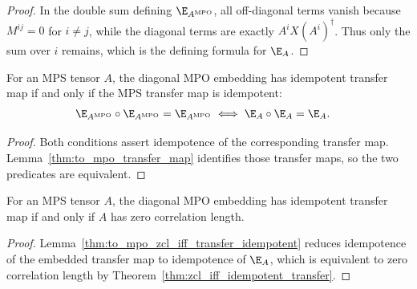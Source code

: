 \begin{proof}
    \leanok
    In the double sum defining $\E_{A^{\mathrm{MPO}}}$, all off-diagonal terms
    vanish because $M^{ij}=0$ for $i\ne j$, while the diagonal terms are
    exactly $A^iX(A^i)^\dagger$. Thus only the sum over $i$ remains, which
    is the defining formula for $\E_A$.
\end{proof}

\begin{lemma}%
    \label{thm:to_mpo_zcl_iff_transfer_idempotent}
    \leanok
    For an MPS tensor $A$, the diagonal MPO embedding has idempotent transfer
    map if and only if the MPS transfer map is idempotent:
    \begin{align}
        \E_{A^{\mathrm{MPO}}}\circ\E_{A^{\mathrm{MPO}}}
        =\E_{A^{\mathrm{MPO}}}
         & \iff
        \E_A\circ\E_A=\E_A.
        \notag
    \end{align}
\end{lemma}

\begin{proof}
    \leanok
    Both conditions assert idempotence of the corresponding transfer map.
    Lemma~\ref{thm:to_mpo_transfer_map} identifies those transfer maps, so
    the two predicates are equivalent.
\end{proof}

\begin{lemma}%
    \label{thm:to_mpo_zcl_iff_zcl}
    \leanok
    For an MPS tensor $A$, the diagonal MPO embedding has idempotent transfer
    map if and only if $A$ has zero correlation length.
\end{lemma}

\begin{proof}
    \leanok
    Lemma~\ref{thm:to_mpo_zcl_iff_transfer_idempotent} reduces idempotence of
    the embedded transfer map to idempotence of $\E_A$, which is equivalent to
    zero correlation length by Theorem~\ref{thm:zcl_iff_idempotent_transfer}.
\end{proof}
